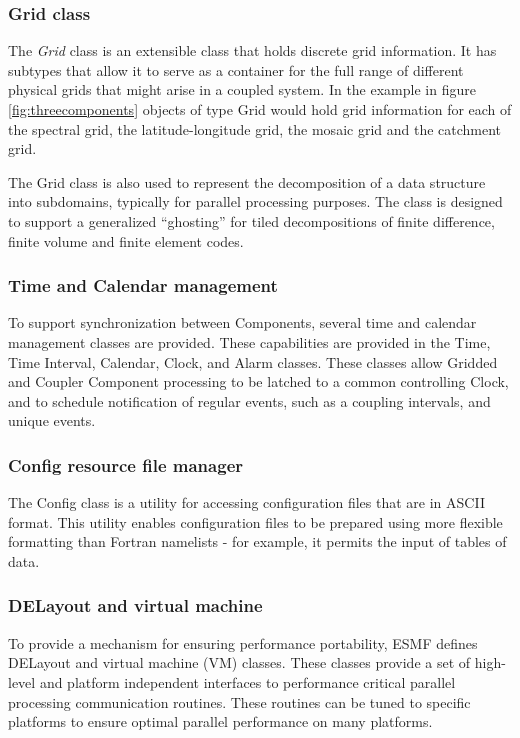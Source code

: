\subsubsection{Grid class}
The {\it Grid} class is an extensible class that holds discrete grid information. It has subtypes that allow
it to serve as a container for the full range of different physical grids that might arise in a coupled system.
In the example in figure \ref{fig:threecomponents} objects of type Grid would hold grid information for
each of the spectral grid, the latitude-longitude grid, the mosaic grid and the catchment grid. 

The Grid class is also used to represent the decomposition of a data structure into subdomains, typically for
parallel processing purposes. The class is designed to support a 
generalized ``ghosting'' for tiled 
decompositions of finite difference, finite volume and finite element codes. 

\subsubsection{Time and Calendar management}
To support synchronization between Components, several time and calendar
management classes are provided.  These capabilities are provided in the Time, 
Time Interval, Calendar, Clock, and Alarm classes. These classes allow Gridded
 and Coupler Component processing to be latched to a common controlling Clock, 
and to schedule notification of
regular events, such as a coupling intervals, and unique events.

\subsubsection{Config resource file manager}
The Config class is a utility for accessing configuration files that are in
ASCII format.  This utility enables configuration files to be prepared using
more flexible formatting than Fortran namelists - for example, it permits the
input of tables of data.

\subsubsection{DELayout and virtual machine}
To provide a mechanism for ensuring performance portability, ESMF defines 
DELayout and virtual machine (VM) classes. These classes provide a set of
high-level and platform independent interfaces to performance critical parallel 
processing communication routines. These routines can be tuned
to specific platforms to ensure optimal parallel performance on many platforms. 

